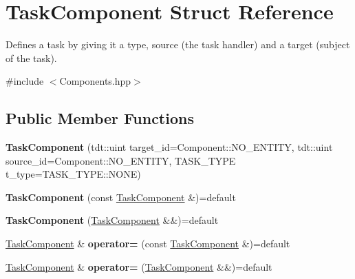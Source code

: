 \hypertarget{struct_task_component}{}\section{Task\+Component Struct Reference}
\label{struct_task_component}


Defines a task by giving it a type, source (the task handler) and a target (subject of the task).  




{\ttfamily \#include $<$Components.\+hpp$>$}

\subsection*{Public Member Functions}
\begin{DoxyCompactItemize}
\item 
{\bfseries Task\+Component} (tdt\+::uint target\+\_\+id=Component\+::\+N\+O\+\_\+\+E\+N\+T\+I\+TY, tdt\+::uint source\+\_\+id=Component\+::\+N\+O\+\_\+\+E\+N\+T\+I\+TY, T\+A\+S\+K\+\_\+\+T\+Y\+PE t\+\_\+type=T\+A\+S\+K\+\_\+\+T\+Y\+P\+E\+::\+N\+O\+NE)\hypertarget{struct_task_component_aa1dc17778221f9c171d027d4ca669e18}{}\label{struct_task_component_aa1dc17778221f9c171d027d4ca669e18}

\item 
{\bfseries Task\+Component} (const \hyperlink{struct_task_component}{Task\+Component} \&)=default\hypertarget{struct_task_component_a5bea8c0a5cf8c094f8a16d261b9ddbf2}{}\label{struct_task_component_a5bea8c0a5cf8c094f8a16d261b9ddbf2}

\item 
{\bfseries Task\+Component} (\hyperlink{struct_task_component}{Task\+Component} \&\&)=default\hypertarget{struct_task_component_aa94f3b8b0ca8cdddb40fdea361afa572}{}\label{struct_task_component_aa94f3b8b0ca8cdddb40fdea361afa572}

\item 
\hyperlink{struct_task_component}{Task\+Component} \& {\bfseries operator=} (const \hyperlink{struct_task_component}{Task\+Component} \&)=default\hypertarget{struct_task_component_ad85f3e8dd2d5f057e375b79acf55cb2f}{}\label{struct_task_component_ad85f3e8dd2d5f057e375b79acf55cb2f}

\item 
\hyperlink{struct_task_component}{Task\+Component} \& {\bfseries operator=} (\hyperlink{struct_task_component}{Task\+Component} \&\&)=default\hypertarget{struct_task_component_a9fe9676d27cf6b8f7f30b44eaf194bf2}{}\label{struct_task_component_a9fe9676d27cf6b8f7f30b44eaf194bf2}

\end{DoxyCompactItemize}
